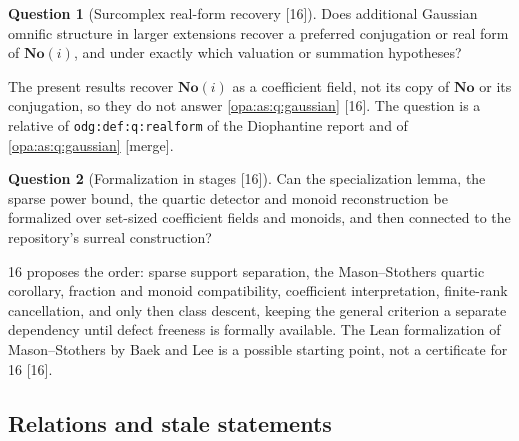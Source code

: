 \documentclass[11pt,oneside]{article}
\numberwithin{equation}{section}
\theoremstyle{definition}
\newtheorem{question}[question]{Question}
\theoremstyle{remark}
\newcommand{\No}{\mathbf{No}}
\newcommand{\SC}{\mathbf{No}(i)}
\newcommand{\src}[1]{\textup{\textsf{\small[#1]}}}
\newcommand{\mergetag}{\textup{\textsf{\small[merge]}}}
\newcommand{\lbl}[1]{\nolinkurl{#1}}
\begin{document}
\begin{question}[Surcomplex real-form recovery \src{16}]\label{opa:cr:q:realform}
Does additional Gaussian omnific structure in larger extensions recover a preferred conjugation or real form of $\SC$, and
under exactly which valuation or summation hypotheses?
\end{question}
The present results recover $\SC$ as a coefficient field, not its copy of $\No$ or its conjugation, so they do not answer
\cref{opa:as:q:gaussian} \src{16}. The question is a relative of \lbl{odg:def:q:realform} of the Diophantine report and of
\cref{opa:as:q:gaussian} \mergetag.

\begin{question}[Formalization in stages \src{16}]\label{opa:cr:q:formal}
Can the specialization lemma, the sparse power bound, the quartic detector and monoid reconstruction be formalized over
set-sized coefficient fields and monoids, and then connected to the repository's surreal construction?
\end{question}
16 proposes the order: sparse support separation, the Mason--Stothers quartic corollary, fraction and monoid compatibility,
coefficient interpretation, finite-rank cancellation, and only then class descent, keeping the general criterion a separate
dependency until defect freeness is formally available. The Lean formalization of Mason--Stothers by Baek and Lee \cite{BL} is a
possible starting point, not a certificate for 16 \src{16}.

\subsection{Relations and stale statements}\label{opa:cr:sub:stale}
\end{document}
